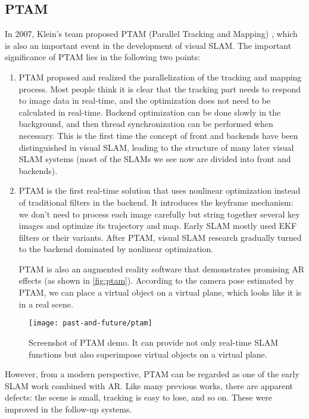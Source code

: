 \subsection{PTAM}
In 2007, Klein's team proposed PTAM (Parallel Tracking and Mapping) {\cite{Klein2007}}, which is also an important event in the development of visual SLAM. The important significance of PTAM lies in the following two points:
\begin{enumerate}
	\item PTAM proposed and realized the parallelization of the tracking and mapping process. Most people think it is clear that the tracking part needs to respond to image data in real-time, and the optimization does not need to be calculated in real-time. Backend optimization can be done slowly in the background, and then thread synchronization can be performed when necessary. This is the first time the concept of front and backends have been distinguished in visual SLAM, leading to the structure of many later visual SLAM systems (most of the SLAMs we see now are divided into front and backends).
	\item PTAM is the first real-time solution that uses nonlinear optimization instead of traditional filters in the backend. It introduces the keyframe mechanism: we don't need to process each image carefully but string together several key images and optimize its trajectory and map. Early SLAM mostly used EKF filters or their variants. After PTAM, visual SLAM research gradually turned to the backend dominated by nonlinear optimization. 
	
	PTAM is also an augmented reality software that demonstrates promising AR effects (as shown in \autoref{fig:ptam}). According to the camera pose estimated by PTAM, we can place a virtual object on a virtual plane, which looks like it is in a real scene.
\end{enumerate}

\begin{figure}[!ht]
	\centering
	\texttt{[image: past-and-future/ptam]}
	\caption{Screenshot of PTAM demo. It can provide not only real-time SLAM functions but also superimpose virtual objects on a virtual plane.}
	\label{fig:ptam}
\end{figure}

However, from a modern perspective, PTAM can be regarded as one of the early SLAM work combined with AR. Like many previous works, there are apparent defects: the scene is small, tracking is easy to lose, and so on. These were improved in the follow-up systems.

